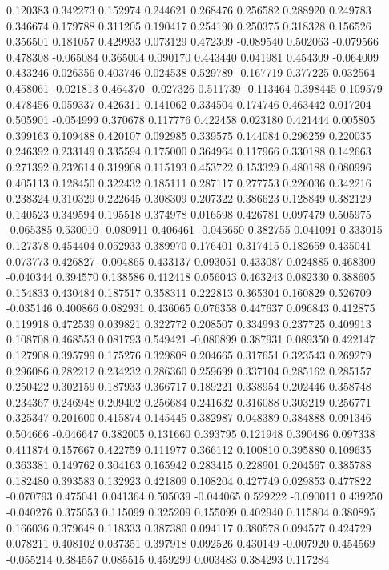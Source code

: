 0.120383
0.342273
0.152974
0.244621
0.268476
0.256582
0.288920
0.249783
0.346674
0.179788
0.311205
0.190417
0.254190
0.250375
0.318328
0.156526
0.356501
0.181057
0.429933
0.073129
0.472309
-0.089540
0.502063
-0.079566
0.478308
-0.065084
0.365004
0.090170
0.443440
0.041981
0.454309
-0.064009
0.433246
0.026356
0.403746
0.024538
0.529789
-0.167719
0.377225
0.032564
0.458061
-0.021813
0.464370
-0.027326
0.511739
-0.113464
0.398445
0.109579
0.478456
0.059337
0.426311
0.141062
0.334504
0.174746
0.463442
0.017204
0.505901
-0.054999
0.370678
0.117776
0.422458
0.023180
0.421444
0.005805
0.399163
0.109488
0.420107
0.092985
0.339575
0.144084
0.296259
0.220035
0.246392
0.233149
0.335594
0.175000
0.364964
0.117966
0.330188
0.142663
0.271392
0.232614
0.319908
0.115193
0.453722
0.153329
0.480188
0.080996
0.405113
0.128450
0.322432
0.185111
0.287117
0.277753
0.226036
0.342216
0.238324
0.310329
0.222645
0.308309
0.207322
0.386623
0.128849
0.382129
0.140523
0.349594
0.195518
0.374978
0.016598
0.426781
0.097479
0.505975
-0.065385
0.530010
-0.080911
0.406461
-0.045650
0.382755
0.041091
0.333015
0.127378
0.454404
0.052933
0.389970
0.176401
0.317415
0.182659
0.435041
0.073773
0.426827
-0.004865
0.433137
0.093051
0.433087
0.024885
0.468300
-0.040344
0.394570
0.138586
0.412418
0.056043
0.463243
0.082330
0.388605
0.154833
0.430484
0.187517
0.358311
0.222813
0.365304
0.160829
0.526709
-0.035146
0.400866
0.082931
0.436065
0.076358
0.447637
0.096843
0.412875
0.119918
0.472539
0.039821
0.322772
0.208507
0.334993
0.237725
0.409913
0.108708
0.468553
0.081793
0.549421
-0.080899
0.387931
0.089350
0.422147
0.127908
0.395799
0.175276
0.329808
0.204665
0.317651
0.323543
0.269279
0.296086
0.282212
0.234232
0.286360
0.259699
0.337104
0.285162
0.285157
0.250422
0.302159
0.187933
0.366717
0.189221
0.338954
0.202446
0.358748
0.234367
0.246948
0.209402
0.256684
0.241632
0.316088
0.303219
0.256771
0.325347
0.201600
0.415874
0.145445
0.382987
0.048389
0.384888
0.091346
0.504666
-0.046647
0.382005
0.131660
0.393795
0.121948
0.390486
0.097338
0.411874
0.157667
0.422759
0.111977
0.366112
0.100810
0.395880
0.109635
0.363381
0.149762
0.304163
0.165942
0.283415
0.228901
0.204567
0.385788
0.182480
0.393583
0.132923
0.421809
0.108204
0.427749
0.029853
0.477822
-0.070793
0.475041
0.041364
0.505039
-0.044065
0.529222
-0.090011
0.439250
-0.040276
0.375053
0.115099
0.325209
0.155099
0.402940
0.115804
0.380895
0.166036
0.379648
0.118333
0.387380
0.094117
0.380578
0.094577
0.424729
0.078211
0.408102
0.037351
0.397918
0.092526
0.430149
-0.007920
0.454569
-0.055214
0.384557
0.085515
0.459299
0.003483
0.384293
0.117284
